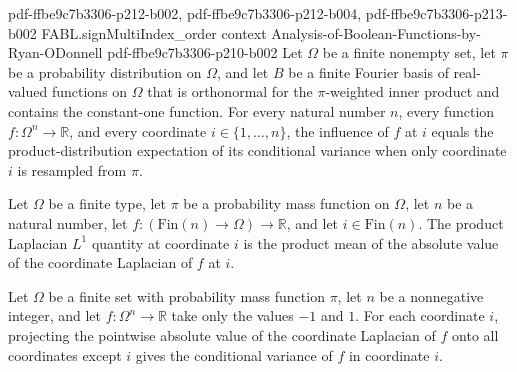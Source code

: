 \begin{theorem}
  {pdf-ffbe9c7b3306-p212-b002,
    pdf-ffbe9c7b3306-p212-b004,
    pdf-ffbe9c7b3306-p213-b002}
\proofstep
  {FABL.signMultiIndex_order}
  {context}
  {Analysis-of-Boolean-Functions-by-Ryan-ODonnell}
  {pdf-ffbe9c7b3306-p210-b002}
Let $\Omega$ be a finite nonempty set, let $\pi$ be a probability distribution on
$\Omega$, and let $B$ be a finite Fourier basis of real-valued functions on $\Omega$
that is orthonormal for the $\pi$-weighted inner product and contains the constant-one
function. For every natural number $n$, every function $f:\Omega^n\to\mathbb R$, and
every coordinate $i\in\{1,\ldots,n\}$, the influence of $f$ at $i$ equals the
product-distribution expectation of its conditional variance when only coordinate $i$ is
resampled from $\pi$.
\end{theorem}

\begin{definition}
\label{FABL.productLaplacianL1}
\leanok
{}
Let $\Omega$ be a finite type, let $\pi$ be a probability mass function on $\Omega$, let
$n$ be a natural number, let $f:(\mathrm{Fin}(n)\to\Omega)\to\mathbb{R}$, and let
$i\in\mathrm{Fin}(n)$. The product Laplacian $L^1$ quantity at coordinate $i$ is the
product mean of the absolute value of the coordinate Laplacian of $f$ at $i$.
\end{definition}

\begin{theorem}
\label{FABL.coordinateProjection_abs_laplacian_eq_coordinateConditionalVariance}
\leanok
{}
Let $\Omega$ be a finite set with probability mass function $\pi$, let $n$ be a
nonnegative integer, and let $f:\Omega^n\to\mathbb R$ take only the values $-1$ and $1$.
For each coordinate $i$, projecting the pointwise absolute value of the coordinate
Laplacian of $f$ onto all coordinates except $i$ gives the conditional variance of $f$
in coordinate $i$.
\end{theorem}

